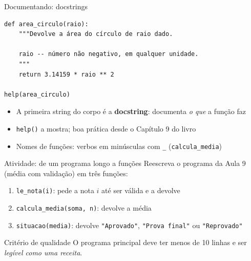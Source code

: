 \documentclass[aspectratio=169,10pt,t]{beamer}
\begin{document}
\begin{frame}[fragile]{Documentando: docstrings}
\begin{lstlisting}
def area_circulo(raio):
    """Devolve a área do círculo de raio dado.

    raio -- número não negativo, em qualquer unidade.
    """
    return 3.14159 * raio ** 2

help(area_circulo)
\end{lstlisting}
  \begin{itemize}
    \item A primeira string do corpo é a \textbf{docstring}: documenta \emph{o que} a função faz
    \item \texttt{help()} a mostra; boa prática desde o Capítulo 9 do livro
    \item Nomes de funções: verbos em minúsculas com \texttt{\_} (\texttt{calcula\_media})
  \end{itemize}
\end{frame}

\begin{frame}{Atividade: de um programa longo a funções}
  Reescreva o programa da Aula 9 (média com validação) em três funções:
  \vspace{1ex}
  \begin{enumerate}
    \item \texttt{le\_nota(i)}: pede a nota \(i\) até ser válida e a devolve
    \item \texttt{calcula\_media(soma, n)}: devolve a média
    \item \texttt{situacao(media)}: devolve \texttt{"Aprovado"}, \texttt{"Prova final"} ou \texttt{"Reprovado"}
  \end{enumerate}
  \vspace{1ex}
  \begin{block}{Critério de qualidade}
    O programa principal deve ter menos de 10 linhas e ser \emph{legível como uma receita}.
  \end{block}
\end{frame}


\end{document}
